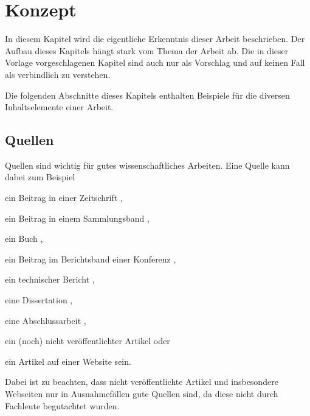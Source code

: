 
\chapter{Konzept}
\label{chapter-konzept}

In diesem Kapitel wird die eigentliche Erkenntnis dieser Arbeit beschrieben. Der Aufbau dieses Kapitels hängt stark vom Thema der Arbeit ab. Die in dieser Vorlage vorgeschlagenen Kapitel sind auch nur als Vorschlag und auf keinen Fall als verbindlich zu verstehen.

Die folgenden Abschnitte dieses Kapitels enthalten Beispiele für die diversen Inhaltselemente einer Arbeit.


\section{Quellen}

Quellen sind wichtig für gutes wissenschaftliches Arbeiten. Eine Quelle kann dabei zum Beispiel
\begin{compactitem}
  \item ein Beitrag in einer Zeitschrift \cite{MopOverview},
  \item ein Beitrag in einem Sammlungsband \cite{moore},
  \item ein Buch \cite{scala},
  \item ein Beitrag im Berichtsband einer Konferenz \cite{rltl},
  \item ein technischer Bericht \cite{bitkom},
  \item eine Dissertation \cite{Leucker02},
  \item eine Abschlussarbeit \cite{RltlConv},
  \item ein (noch) nicht veröffentlichter Artikel \cite{ptLTL} oder
  \item ein Artikel auf einer Website \cite{codecommit} sein.
\end{compactitem}

Dabei ist zu beachten, dass nicht veröffentlichte Artikel und insbesondere Webseiten nur in Ausnahmefällen gute Quellen sind, da diese nicht durch Fachleute begutachtet wurden.

